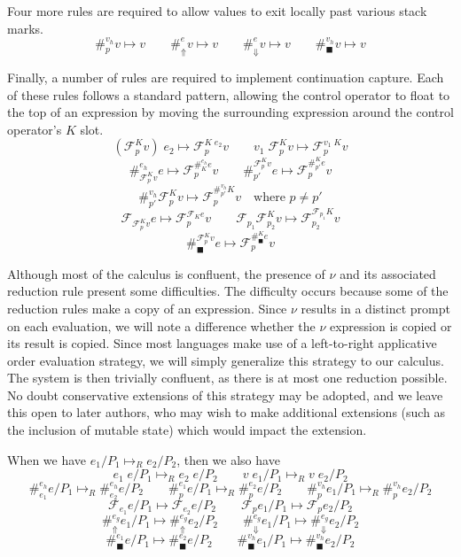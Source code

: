 \documentclass[11pt]{article}
\newcommand\F{\mathcal{F}}
\begin{document}
Four more rules are required to allow values to exit locally past various stack marks.
$$\#_p^{v_h} v \mapsto v \qquad
  \#_{\Uparrow}^{e}v \mapsto v \qquad
  \#_{\Downarrow}^{e}v \mapsto v \qquad
  \#_\blacksquare^{v_h}v \mapsto v$$

Finally, a number of rules are required to implement continuation capture.
Each of these rules follows a standard pattern, allowing the control operator to float to the top of an expression by moving the surrounding expression around the control operator's $K$ slot.
$$(\F^K_pv)\;e_2 \mapsto \F^{K\;e_2}_pv \qquad
  v_1\;\F^K_pv \mapsto \F^{v_1\;K}_pv$$
$$\#_{\F_p^Kv}^{e_h}e \mapsto \F_p^{\#_K^{e_h}e}v \qquad
  \#^{\F_p^Kv}_{p'}e \mapsto \F_p^{\#^K_{p'}e}v$$
$$\#_{p'}^{v_h}\F^K_pv \mapsto \F^{\#_{p'}^{v_h}K}_pv
  	\quad\textrm{where }p \neq p'$$
$$\F_{\F^K_pv}e \mapsto \F^{\F_Ke}_pv \qquad
  \F_{p_1}\F^K_{p_2}v \mapsto \F^{\F_{p_1}K}_{p_2}v$$
$$\#_\blacksquare^{\F_p^K v}e \mapsto \F_p^{\#_\blacksquare^K e}v$$

Although most of the calculus is confluent, the presence of $\nu$ and its associated reduction rule present some difficulties.
The difficulty occurs because some of the reduction rules make a copy of an expression.
Since $\nu$ results in a distinct prompt on each evaluation, we will note a difference whether the $\nu$ expression is copied or its result is copied.
Since most languages make use of a left-to-right applicative order evaluation strategy, we will simply generalize this strategy to our calculus.
The system is then trivially confluent, as there is at most one reduction possible.
No doubt conservative extensions of this strategy may be adopted, and we leave this open to later authors, who may wish to make additional extensions (such as the inclusion of mutable state) which would impact the extension.

When we have $e_1/P_1 \mapsto_R e_2/P_2$, then we also have
$$e_1\;e/P_1 \mapsto_R e_2\;e/P_2 \qquad
  v\;e_1/P_1 \mapsto_R v\;e_2/P_2$$
$$\#_{e_1}^{e_h}e/P_1 \mapsto_R \#_{e_2}^{e_h}e/P_2 \qquad
  \#_{p}^{e_1}e/P_1 \mapsto_R \#_{p}^{e_2}e/P_2 \qquad
  \#_{p}^{v_h}e_1/P_1 \mapsto_R \#_{p}^{v_h}e_2/P_2$$
$$\F_{e_1} e/P_1 \mapsto \F_{e_2} e/P_2 \qquad
  \F_{p} e_1/P_1 \mapsto \F_{p} e_2/P_2$$
$$\#_\Uparrow^{e_g}e_1/P_1 \mapsto \#_\Uparrow^{e_g}e_2/P_2 \qquad
  \#_\Downarrow^{e_g}e_1/P_1 \mapsto \#_\Downarrow^{e_g}e_2/P_2$$
$$\#_\blacksquare^{e_1}e/P_1 \mapsto \#_\blacksquare^{e_2}e/P_2 \qquad
  \#_\blacksquare^{v_h}e_1/P_1 \mapsto \#_\blacksquare^{v_h}e_2/P_2$$
\end{document}
